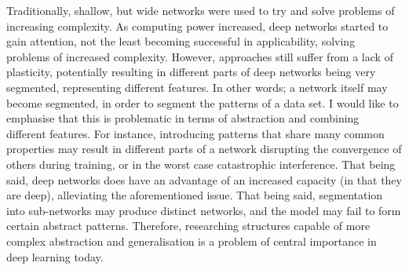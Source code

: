 
Traditionally, shallow, but wide networks were used to try and solve problems of increasing complexity.
As computing power increased, deep networks started to gain attention, not the least becoming successful in applicability, solving problems of increased complexity. However, approaches still suffer from a lack of plasticity, potentially resulting in different parts of deep networks being very segmented, representing different features. In other words; a network itself may become segmented, in order to segment the patterns of a data set. I would like to emphasise that this is problematic in terms of abstraction and combining different features. For instance, introducing patterns that share many common properties may result in different parts of a network disrupting the convergence of others during training, or in the worst case catastrophic interference.
That being said, deep networks does have an advantage of an increased capacity (in that they are deep), alleviating the aforementioned issue. That being said, segmentation into sub-networks may produce distinct networks, and the model may fail to form certain abstract patterns. Therefore, researching structures capable of more complex abstraction and generalisation is a problem of central importance in deep learning today.
\\

